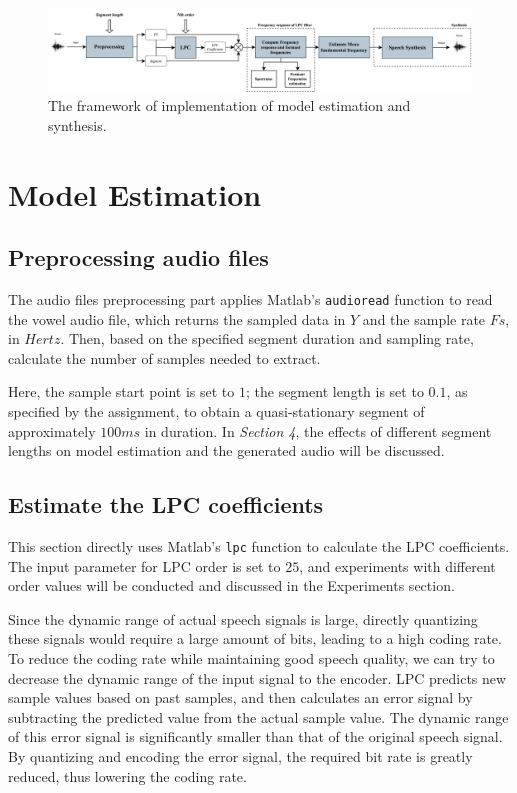 \documentclass{article}
\begin{document}
\begin{figure}[ht]
  \begin{center}
  \includegraphics[width=18cm]{The framework of implementation of model estimation and synthesis}
  \end{center}
  \caption{\label{fig:framework} The framework of implementation of model estimation and synthesis.}
  \end{figure}


\section{Model Estimation}

\subsection{Preprocessing audio files}

The audio files preprocessing part applies Matlab’s \verb+audioread+ function to read the vowel audio file, which returns the sampled data in $Y$ and the sample rate $Fs$, in $Hertz$. Then, based on the specified segment duration and sampling rate, calculate the number of samples needed to extract.

Here, the sample start point is set to $1$; the segment length is set to $0.1$, as specified by the assignment, to obtain a quasi-stationary segment of approximately $100 ms$ in duration. In \textit{Section 4}, the effects of different segment lengths on model estimation and the generated audio will be discussed.


\subsection{Estimate the LPC coefficients}

This section directly uses Matlab’s \verb+lpc+ function to calculate the LPC coefficients. The input parameter for LPC order is set to $25$, and experiments with different order values will be conducted and discussed in the Experiments section.

Since the dynamic range of actual speech signals is large, directly quantizing these signals would require a large amount of bits, leading to a high coding rate. To reduce the coding rate while maintaining good speech quality, we can try to decrease the dynamic range of the input signal to the encoder. LPC predicts new sample values based on past samples, and then calculates an error signal by subtracting the predicted value from the actual sample value. The dynamic range of this error signal is significantly smaller than that of the original speech signal. By quantizing and encoding the error signal, the required bit rate is greatly reduced, thus lowering the coding rate\citep{kondoz2005digital}.
\end{document}
